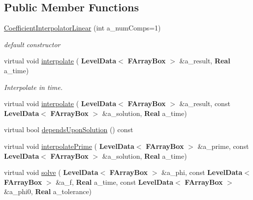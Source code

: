 \subsection*{Public Member Functions}
\begin{DoxyCompactItemize}
\item 
\mbox{\label{class_coefficient_interpolator_linear_a99f4253fee5e273890ca1dbf9f9ff60e}} 
\hyperlink{class_coefficient_interpolator_linear_a99f4253fee5e273890ca1dbf9f9ff60e}{Coefficient\+Interpolator\+Linear} (int a\+\_\+num\+Comps=1)
\begin{DoxyCompactList}\small\item\em default constructor \end{DoxyCompactList}\item 
\mbox{\label{class_coefficient_interpolator_linear_ae9e668747f2c5a702d022c26d27ceb3a}} 
virtual void \hyperlink{class_coefficient_interpolator_linear_ae9e668747f2c5a702d022c26d27ceb3a}{interpolate} (\textbf{ Level\+Data}$<$ \textbf{ F\+Array\+Box} $>$ \&a\+\_\+result, \textbf{ Real} a\+\_\+time)
\begin{DoxyCompactList}\small\item\em Interpolate in time. \end{DoxyCompactList}\item 
virtual void \hyperlink{class_coefficient_interpolator_linear_a7558771f5d460bb587cc8f90c0156b1f}{interpolate} (\textbf{ Level\+Data}$<$ \textbf{ F\+Array\+Box} $>$ \&a\+\_\+result, const \textbf{ Level\+Data}$<$ \textbf{ F\+Array\+Box} $>$ \&a\+\_\+solution, \textbf{ Real} a\+\_\+time)
\item 
virtual bool \hyperlink{class_coefficient_interpolator_linear_a649a101d1f3608951470426a47bc4c54}{depends\+Upon\+Solution} () const
\item 
virtual void \hyperlink{class_coefficient_interpolator_linear_a86904e8968464cbeaf2c5dbae76f7545}{interpolate\+Prime} (\textbf{ Level\+Data}$<$ \textbf{ F\+Array\+Box} $>$ \&a\+\_\+prime, const \textbf{ Level\+Data}$<$ \textbf{ F\+Array\+Box} $>$ \&a\+\_\+solution, \textbf{ Real} a\+\_\+time)
\item 
virtual void \hyperlink{class_coefficient_interpolator_linear_ab1c2295a8ed1749ad55dd366bde4139a}{solve} (\textbf{ Level\+Data}$<$ \textbf{ F\+Array\+Box} $>$ \&a\+\_\+phi, const \textbf{ Level\+Data}$<$ \textbf{ F\+Array\+Box} $>$ \&a\+\_\+f, \textbf{ Real} a\+\_\+time, const \textbf{ Level\+Data}$<$ \textbf{ F\+Array\+Box} $>$ \&a\+\_\+phi0, \textbf{ Real} a\+\_\+tolerance)

\end{DoxyCompactItemize}
